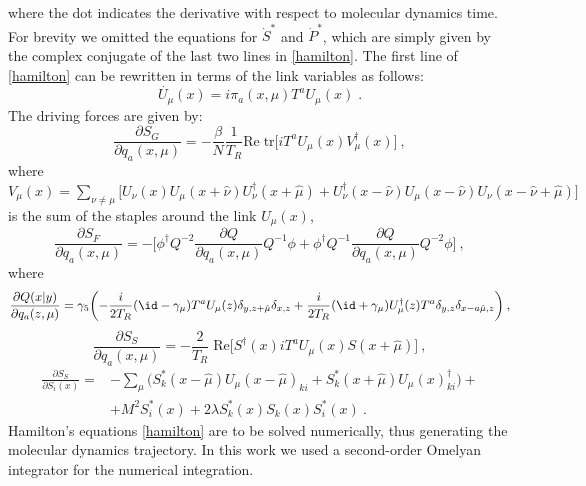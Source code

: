 %
where the dot indicates the derivative with respect to molecular dynamics time. For brevity we omitted the equations for $\dot S^*$ and $\dot P^*$, which are simply given by the complex conjugate of the last two lines in \ref{hamilton}.
The first line of \ref{hamilton} can be rewritten in terms of the link variables as follows:
\begin{equation}
\dot{U_{\mu}}(x)= i \pi_a(x,\mu)T^a U_{\mu}(x) \; .
\end{equation}
%
The driving forces are given by:
\begin{equation}
\frac{\partial S_G}{\partial q_a(x,\mu)} = - \frac{\beta}{N} \frac{1}{T_R} \mathrm{Re \; tr} \biggl[ i T^a U_{\mu}(x) V^{\dagger}_{\mu} (x) \biggr]\: ,
\end{equation}
%
where $V_{\mu}(x) = \sum_{\nu \neq \mu} \bigl[ U_{\nu}(x) U_{\mu}(x+\hat\nu) U_{\nu}^{\dagger}(x+\hat\mu) + 
U_{\nu}^{\dagger}(x - \hat\nu) U_{\mu}(x - \hat\nu) U_{\nu}(x-\hat\nu+\hat\mu)\bigr]$ is the sum of the staples around the link $U_{\mu}(x)$,
\begin{equation}
\frac{\partial S_F}{\partial q_a(x,\mu)} =   -\biggl[ \phi^{\dagger} Q^{-2}\frac{\partial Q}{\partial q_a(x,\mu)} Q^{-1} \phi + \phi^{\dagger} Q^{-1} \frac{\partial Q}{\partial q_a(x,\mu)} Q^{-2} \phi \biggr] \: ,
\end{equation}
%
where
\begin{equation}
\frac{\partial Q(x \vert y)}{\partial q_a(z,\mu)} = \gamma_5 \biggl( -\frac{i}{2T_R} (\id - \gamma_{\mu}) T^a U_{\mu}(z) \delta_{y,z+\hat\mu} \delta_{x,z} +\frac{i}{2T_R}(\id + \gamma_{\mu}) U_{\mu}^{\dagger}(z) T^a \delta_{y,z} \delta_{x-a\hat\mu,z} \biggr) \: ,
\end{equation}
\begin{equation}
\frac{\partial S_S}{\partial q_a(x,\mu)} = - \frac{2}{T_R} \; \mathrm{Re} \biggl[ S^{\dagger}(x) i T^a U_{\mu}(x) S(x+\hat\mu) \biggr] \: ,
\end{equation}
\begin{equation}
\begin{split}
\frac{\partial S_S}{\partial S_i(x)} = & - \sum_{\mu} \biggl( S^*_k(x-\hat \mu) U_{\mu}(x-\hat\mu)_{ki} + S^*_k(x+\hat\mu) U_{\mu}(x)^{\dagger}_{ki} \biggr) +  \\
& + M^2 S_i^*(x) + 2 \lambda S_k^*(x) S_k(x) S_i^*(x) \: .
\end{split}
\end{equation}
%
Hamilton's equations \ref{hamilton} are to be solved numerically, thus generating the molecular dynamics trajectory. In this work we used a second-order Omelyan integrator \cite{PhysRevE.65.056706,OMELYAN2003272} for the numerical integration.


